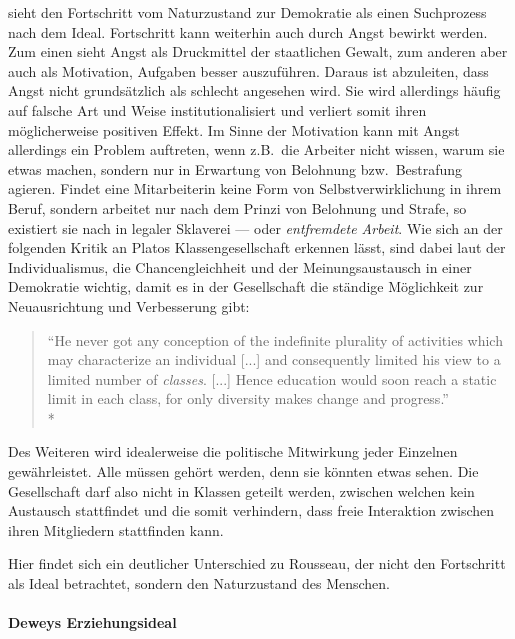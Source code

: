 \citeauthor{Dewey2010} sieht den Fortschritt vom Naturzustand zur Demokratie als einen Suchprozess nach dem Ideal.
Fortschritt kann weiterhin auch durch Angst bewirkt werden.
Zum einen sieht \citeauthor{Dewey2010} Angst als Druckmittel der staatlichen Gewalt, zum anderen aber auch als Motivation, Aufgaben besser auszuführen.
Daraus ist abzuleiten, dass Angst nicht grundsätzlich als schlecht angesehen wird.
Sie wird allerdings häufig auf falsche Art und Weise institutionalisiert und verliert somit ihren möglicherweise positiven Effekt.
Im Sinne der Motivation kann mit Angst allerdings ein Problem auftreten, wenn z.B.\ die Arbeiter nicht wissen, warum sie etwas machen, sondern nur in Erwartung von Belohnung bzw.\ Bestrafung agieren.
Findet eine Mitarbeiterin keine Form von Selbstverwirklichung in ihrem Beruf, sondern arbeitet nur nach dem Prinzi von Belohnung und Strafe, so existiert sie nach \citeauthor{Dewey2010} in legaler Sklaverei --- oder \emph{entfremdete Arbeit}.
Wie sich an der folgenden Kritik an Platos Klassengesellschaft erkennen lässt, sind dabei laut \citeauthor{Dewey2010} der Individualismus, die Chancengleichheit und der Meinungsaustausch in einer Demokratie wichtig, damit es in der Gesellschaft die ständige Möglichkeit zur Neuausrichtung und Verbesserung gibt:

\begin{quote}
	``He never got any conception of the indefinite plurality of activities which may characterize an individual [...] and consequently limited his view to a limited number of \emph{classes}. [...]
	Hence education would soon reach a static limit in each class, for only diversity makes change and progress.''\\*
	\parencite[95f.]{Dewey-1916}
\end{quote}

Des Weiteren wird idealerweise die politische Mitwirkung jeder Einzelnen gewährleistet.
Alle müssen gehört werden, denn sie könnten etwas sehen.
Die Gesellschaft darf also nicht in Klassen geteilt werden, zwischen welchen kein Austausch stattfindet und die somit verhindern, dass freie Interaktion zwischen ihren Mitgliedern stattfinden kann.

Hier findet sich ein deutlicher Unterschied zu Rousseau, der nicht den Fortschritt als Ideal betrachtet, sondern den Naturzustand des Menschen.


\paragraph{Deweys Erziehungsideal}


